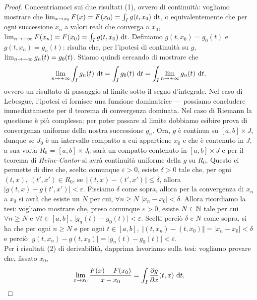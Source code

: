 \documentclass[Completo.tex]{subfiles}
\begin{document}
\begin{proof}
Concentriamoci sui due risultati (1), ovvero di continuità: vogliamo mostrare che $\lim_{x \rightarrow x_0} F(x) = F(x_0) = \int_I g(t,x_0) \ \mathrm{d}t$, o equivalentemente che per ogni successione $x_n$ a valori reali che converga a $x_0$, $\lim_{n \rightarrow +\infty} F(x_n) = F(x_0) = \int_I g(t, x_0) \ \mathrm{d}t$. Definiamo $g(t, x_0) = g_0(t)$ e $g(t, x_n) = g_n(t)$: risulta che, per l'ipotesi di continuità su $g$, $\lim_{n \rightarrow +\infty} g_n(t) = g_0(t)$. Stiamo quindi cercando di mostrare che 
\begin{equation*}
\lim_{n \ra +\infty} \int_I g_n(t) \ \mathrm{d}t = \int_I g_0(t) \ \mathrm{d}t = \int_I \lim_{n \ra +\infty} g_n(t) \ \mathrm{d}t,
\end{equation*}
ovvero un risultato di passaggio al limite sotto il segno d'integrale. Nel caso di Lebesgue, l'ipotesi ci fornisce una funzione dominatrice --- possiamo concludere immediatamente per il teorema di convergenza dominata. Nel caso di Riemann la questione è più complessa: per poter passare al limite dobbiamo esibire prova di convergenza uniforme della nostra successione $g_n$. Ora, $g$ è continua su $[a,b] \times J$, dunque se $J_0$ è un intervallo compatto a cui appartiene $x_0$ e che è contenuto in $J$, a sua volta $R_0$ = $[a,b] \times J_0$ sarà un compatto contenuto in $[a,b] \times J$ e per il teorema di \textit{Heine-Cantor} si avrà continuità uniforme della $g$ su $R_0$. Questo ci permette di dire che, scelto comunque $\varepsilon > 0$, esiste $\delta > 0$ tale che, per ogni $(t, x), \ (t', x') \in R_0$, se $\Vert (t,x) - (t',x') \Vert \leq \delta$, allora $\vert g(t,x) - g(t',x') \vert < \varepsilon$. Fissiamo $\delta$ come sopra, allora per la convergenza di $x_n$ a $x_0$ si avrà che esiste un $N$ per cui, $\forall n \geq N$ $\vert x_n - x_0 \vert < \delta$. Allora ricordiamo la tesi: vogliamo mostrare che, preso comunque $\varepsilon > 0$, esiste $N \in \bb[N]$ tale per cui $\forall n \geq N$ e $\forall t \in [a,b]$, $\vert g_n(t) - g_0(t) \vert < \varepsilon$. Scelti perciò $\delta$ e $N$ come sopra, si ha che per ogni $n \geq N$ e per ogni $t \in [a,b]$, $\Vert (t, x_n) - (t, x_0) \Vert = \vert x_n - x_0 \vert < \delta$ e perciò $\vert g(t, x_n) - g(t, x_0) \vert = \vert g_n(t) - g_0(t) \vert < \varepsilon$. \\
Per i risultati (2) di derivabilità, dapprima lavoriamo sulla tesi: vogliamo provare che, fissato $x_0$,
\begin{equation*}
\lim_{x \ra x_0} \frac{F(x) - F(x_0)}{x - x_0} = \int_I \frac{\pd g}{\pd x}(t,x) \ \mathrm{d}t,

\end{equation*}
\end{proof}
\end{document}
